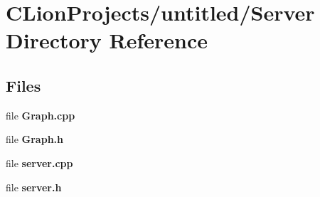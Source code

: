 \section{C\+Lion\+Projects/untitled/\+Server Directory Reference}
\label{dir_2724605c468a01d97d56c18a3ca14e18}
\subsection*{Files}
\begin{DoxyCompactItemize}
\item 
file \textbf{ Graph.\+cpp}
\item 
file \textbf{ Graph.\+h}
\item 
file \textbf{ server.\+cpp}
\item 
file \textbf{ server.\+h}
\end{DoxyCompactItemize}
